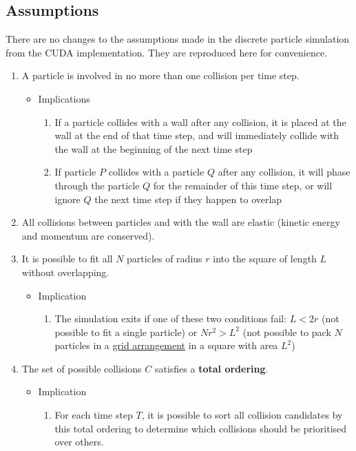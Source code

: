 \documentclass[12pt]{article}
\begin{document}
\subsection{Assumptions}

There are no changes to the assumptions made in the discrete particle simulation from the CUDA implementation. They are reproduced here for convenience.

\begin{enumerate}
	\item A particle is involved in no more than one collision per time step.
	\begin{itemize}
		\item Implications
		\begin{enumerate}
			\item If a particle collides with a wall after any collision, it is placed at the wall at the end of that time step, and will immediately collide with the wall at the beginning of the next time step
			\item If particle $P$ collides with a particle $Q$ after any collision, it will phase through the particle $Q$ for the remainder of this time step, or will ignore $Q$ the next time step if they happen to overlap
		\end{enumerate}
	\end{itemize}
	\item All collisions between particles and with the wall are elastic (kinetic energy and momentum are conserved). 
	\item It is possible to fit all $N$ particles of radius $r$ into the square of length $L$ without overlapping.
	\begin{itemize}
		\item Implication
		\begin{enumerate}
			\item The simulation exits if one of these two conditions fail: $L < 2r$ (not possible to fit a single particle) or $Nr^2 > L^2$ (not possible to pack $N$ particles in a \ul{grid arrangement} in a square with area $L^2$)
		\end{enumerate}
	\end{itemize}
	\item The set of possible collisions $C$ satisfies a \textbf{total ordering}.
	\begin{itemize}
		\item Implication
		\begin{enumerate}
			\item For each time step $T$, it is possible to sort all collision candidates by this total ordering to determine which collisions should be prioritised over others.
		\end{enumerate}
	\end{itemize}
\end{enumerate}
\end{document}
